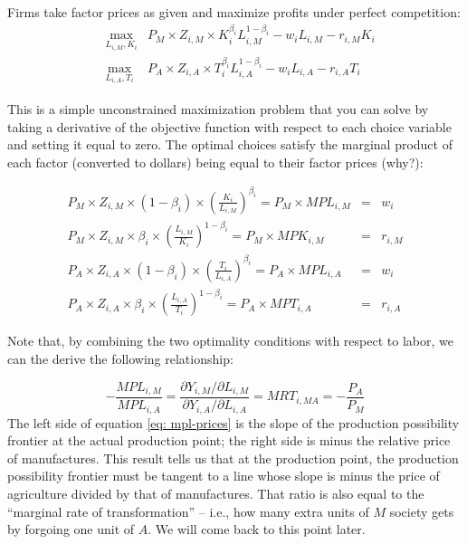 \documentclass[11pt,letterpaper]{article}
\begin{document}
Firms take factor prices as given and maximize profits under perfect competition:
        \begin{eqnarray*}\label{eq: production}
            &\max_{L_{i,M}, K_{i}}& P_{M} \times  Z_{i,M} \times K_{i}^{\beta_i} L_{i,M}^{1-\beta_i} - w_i L_{i,M} - r_{i,M} K_{i} \\
            &\max_{L_{i,A}, T_{i}}& P_{A} \times  Z_{i,A} \times T_{i}^{\beta_i} L_{i,A}^{1-\beta_i} - w_i L_{i,A} - r_{i,A} T_{i} 
        \end{eqnarray*}

This is a simple unconstrained maximization problem that you can solve by taking a derivative of the objective function with respect to each choice variable and setting it equal to zero. The optimal choices satisfy the marginal product of each factor (converted to dollars) being equal to their factor prices (why?):

\begin{eqnarray*}
    P_{M} \times  Z_{i,M} \times (1-\beta_i) \times \left( \frac{K_{i}}{L_{i,M}} \right)^{\beta_i} = P_M \times MPL_{i,M} &=& w_i \\
    P_{M} \times  Z_{i,M} \times \beta_i \times \left( \frac{L_{i,M}}{K_{i}} \right)^{1-\beta_i} = P_M \times MPK_{i,M} &=& r_{i,M} \\
    P_{A} \times  Z_{i,A} \times (1-\beta_i) \times \left( \frac{T_{i}}{L_{i,A}} \right)^{\beta_i} = P_A \times MPL_{i,A} &=& w_i \\
    P_{A} \times  Z_{i,A} \times \beta_i \times \left( \frac{L_{i,A}}{T_{i}} \right)^{1-\beta_i} = P_A \times MPT_{i,A} &=& r_{i,A}
\end{eqnarray*}

Note that, by combining the two optimality conditions with respect to labor, we can the derive the following relationship:

\begin{equation}\label{eq: mpl-prices}
    -\frac{MPL_{i,M}}{MPL_{i,A}} = \frac{\partial Y_{i,M}/\partial L_{i,M}}{\partial Y_{i,A}/\partial L_{i,A}} = MRT_{i,MA} = -\frac{P_A}{P_M}
\end{equation}
The left side of equation \eqref{eq: mpl-prices} is the slope of the production possibility frontier at the actual production point; the right side is minus the relative price of manufactures. This result tells us that at the production point, the production possibility frontier must be tangent to a line whose slope is minus the price of agriculture divided by that of manufactures. That ratio is also equal to the ``marginal rate of transformation'' -- i.e., how many extra units of $M$ society gets by forgoing one unit of $A$. We will come back to this point later. 
\end{document}
